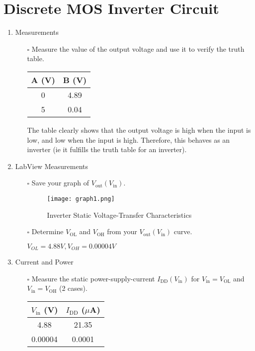 \documentclass[12pt]{article}
\begin{document}
\clearpage
\section{Discrete MOS Inverter Circuit}
\begin{enumerate}
\item Measurements
\begin{itemize}
    \item[$\square$] Measure the value of the output voltage and use it to verify the truth table.

\begin{tabular}{|c|c|}
\hline
A (V) & B (V) \\
\hline
0 & 4.89 \\
5 & 0.04 \\
\hline
\end{tabular}

The table clearly shows that the output voltage is high when the input is low, and low when the input is high.
Therefore, this behaves as an inverter (ie it fulfills the truth table for an inverter).

    
\end{itemize}
\item LabView Measurements
\begin{itemize}
    \item [$\square$] Save your graph of $V_\mathrm{out}(V_\mathrm{in})$.

\begin{figure}[h]
    \centering
    \texttt{[image: graph1.png]}
    \caption{Inverter Static Voltage-Transfer Characteristics}
    \label{fig:Static-Voltage-Transfer-Characteristics}
\end{figure}

    
    \item [$\square$] Determine $V_\mathrm{OL}$ and $V_\mathrm{OH}$ from your $V_\mathrm{out}(V_\mathrm{in})$ curve.

    $V_{OL} = 4.88 V, V_{OH} = 0.00004 V$
    
\end{itemize}
\item Current and Power
\begin{itemize}
    \item[$\square$] Measure the static power-supply-current $I_\mathrm{DD}(V_\mathrm{in})$ for $V_\mathrm{in} = V_\mathrm{OL}$ and $V_\mathrm{in} = V_\mathrm{OH}$ (2 cases).

\begin{tabular}{|c|c|}
\hline
$V_\mathrm{in}$ (V) & $I_\mathrm{DD}$ ($\mu$A) \\
\hline
4.88 & 21.35 \\
0.00004 & 0.0001 \\
\hline
\end{tabular}


\end{itemize}
\end{enumerate}
\end{document}
